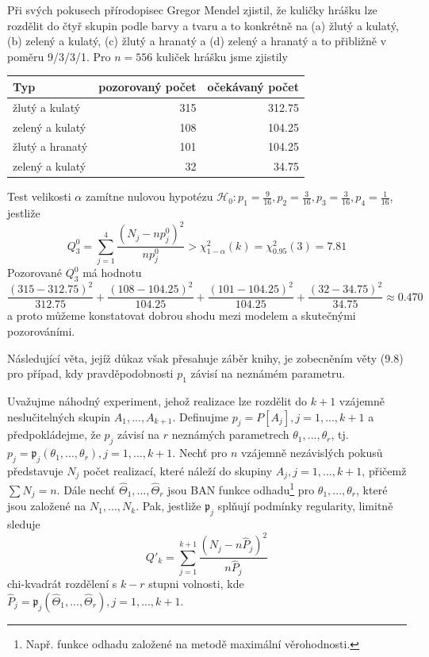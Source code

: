 \begin{example}
Při svých pokusech přírodopisec Gregor Mendel zjistil, že kuličky hrášku lze rozdělit do čtyř skupin podle barvy a tvaru a to konkrétně na (a) žlutý a kulatý, (b) zelený a kulatý, (c) žlutý a hranatý a (d) zelený a hranatý a to přibližně v poměru 9/3/3/1. Pro $n = 556$ kuliček hrášku jsme zjistily
\begin{center}
  \begin{tabular}{|l|r|r|}
    \hline
    \textbf{Typ} & \textbf{pozorovaný počet} & \textbf{očekávaný počet}\\
    \hline
    žlutý a kulatý & 315 & 312.75\\
    zelený a kulatý & 108 & 104.25\\
    žlutý a hranatý & 101 & 104.25\\
    zelený a kulatý & 32 & 34.75\\
    \hline
  \end{tabular}
\end{center}
Test velikosti $\alpha$ zamítne nulovou hypotézu $\mathscr{H}_0: p_1 = \frac{9}{16}, p_2 = \frac{3}{16}, p_3 = \frac{3}{16}, p_4 = \frac{1}{16}$, jestliže
\begin{equation*}
Q_3^0 = \sum_{j = 1}^4 \frac{(N_j - n p_j^0)^2}{n p_j^0} > \chi_{1 - \alpha}^2(k) = \chi_{0.95}^2(3) = 7.81
\end{equation*}
Pozorované $Q_3^0$ má hodnotu
\begin{equation*}
\frac{(315 - 312.75)^2}{312.75} + \frac{(108 - 104.25)^2}{104.25} + \frac{(101 - 104.25)^2}{104.25} + \frac{(32 - 34.75)^2}{34.75} \approx 0.470
\end{equation*}
a proto můžeme konstatovat dobrou shodu mezi modelem a skutečnými pozorováními.
\end{example}

Následující věta, jejíž důkaz však přesahuje záběr knihy, je zobecněním věty (9.8) pro případ, kdy pravděpodobnosti $p_1$ závisí na neznámém parametru.

\begin{theorem}
Uvažujme náhodný experiment, jehož realizace lze rozdělit do $k + 1$ vzájemně neslučitelných skupin $A_1, ..., A_{k + 1}$. Definujme $p_j = P[A_j], j = 1, ..., k + 1$ a předpokládejme, že $p_j$ závisí na $r$ neznámých parametrech $\theta_1, ..., \theta_r$, tj. $p_j = \mathfrak{p}_j(\theta_1, ..., \theta_r), j = 1, ..., k + 1$. Nechť pro $n$ vzájemně nezávislých pokusů představuje $N_j$ počet realizací, které náleží do skupiny $A_j, j = 1, ..., k + 1$, přičemž $\sum N_j = n$. Dále nechť $\hat{\Theta}_1, ..., \hat{\Theta}_r$ jsou BAN funkce odhadu\footnote{Např. funkce odhadu založené na metodě maximální věrohodnosti.} pro $\theta_1, ..., \theta_r$, které jsou založené na $N_1, ..., N_k$. Pak, jestliže $\mathfrak{p}_j$ splňují podmínky regularity, limitně sleduje
\begin{equation*}
Q'_k = \sum_{j = 1}^{k + 1}\frac{(N_j - n \hat{P}_j)^2}{n \hat{P}_j}
\end{equation*}
chi-kvadrát rozdělení s $k - r$ stupni volnosti, kde $\hat{P}_j = \mathfrak{p}_j(\hat{\Theta}_1, ..., \hat{\Theta}_r), j = 1, ..., k + 1$.
\end{theorem}

